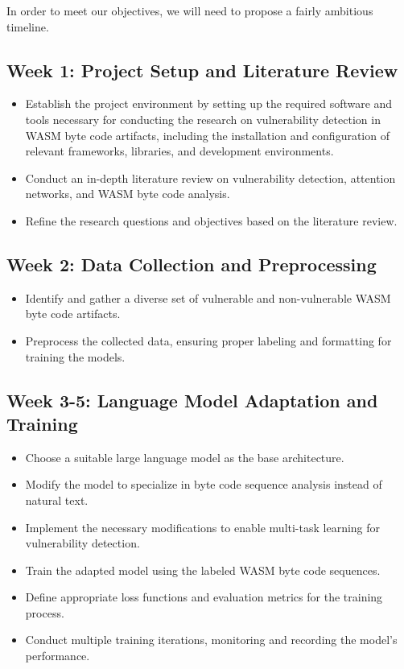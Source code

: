 \documentclass{article}
\begin{document}
In order to meet our objectives, we will need to propose a fairly ambitious timeline.

\subsection{Week 1: Project Setup and Literature Review}
\begin{itemize}
\item Establish the project environment by setting up the required software and tools necessary for conducting the research on vulnerability detection in WASM byte code artifacts, including the installation and configuration of relevant frameworks, libraries, and development environments.
\item Conduct an in-depth literature review on vulnerability detection, attention networks, and WASM byte code analysis. 
\item Refine the research questions and objectives based on the literature review. 
\end{itemize}

\subsection{Week 2: Data Collection and Preprocessing}
\begin{itemize}
\item Identify and gather a diverse set of vulnerable and non-vulnerable WASM byte code artifacts. 
\item Preprocess the collected data, ensuring proper labeling and formatting for training the models.
\end{itemize}

\subsection{Week 3-5: Language Model Adaptation and Training}
\begin{itemize}
\item Choose a suitable large language model as the base architecture. 
\item Modify the model to specialize in byte code sequence analysis instead of natural text. 
\item Implement the necessary modifications to enable multi-task learning for vulnerability detection. 
\item Train the adapted model using the labeled WASM byte code sequences. 
\item Define appropriate loss functions and evaluation metrics for the training process. 
\item Conduct multiple training iterations, monitoring and recording the model's performance.
\end{itemize}
\end{document}
